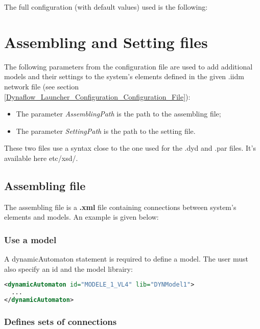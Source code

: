 \documentclass[a4paper, 12pt]{report}
\begin{document}
The full configuration (with default values) used is the following:



\section{Assembling and Setting files}

The following parameters from the configuration file are used to add additional models and their settings to the system's elements defined in the given .iidm network file (see section \ref{Dynaflow_Launcher_Configuration_Configuration_File}):
\begin{itemize}
  \item The parameter \textit{AssemblingPath} is the path to the assembling file;
  \item The parameter \textit{SettingPath} is the path to the setting file.
\end{itemize}

These two files use a syntax close to the one used for the .dyd and .par files. It's available here etc/xsd/.

\subsection{Assembling file}

The assembling file is a \textbf{.xml} file containing connections between system's elements and models. An example is given below:



\subsubsection{Use a model}

A dynamicAutomaton statement is required to define a model. The user must also specify an id and the model librairy:

\begin{lstlisting}[language=XML, morekeywords={dynamicAutomaton}]
<dynamicAutomaton id="MODELE_1_VL4" lib="DYNModel1">
  ...
</dynamicAutomaton>
\end{lstlisting}

\subsubsection{Defines sets of connections}
\end{document}
